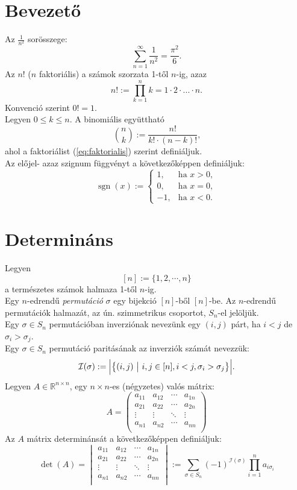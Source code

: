 \documentclass{article}
\DeclareMathOperator{\sign}{sgn}
\begin{document}
\section{Bevezető}
Az $\frac{1}{n^2}$ sorösszege:
\[ \sum_{n=1}^\infty \frac{1}{n^2} = \frac{\pi^2}{6} \text{.} \]
Az $n!$ ($n$ faktoriális) a számok szorzata 1-től $n$-ig, azaz
\begin{equation}\label{eq:faktorialis}
n! := \prod_{k = 1}^n k = 1 \cdot 2 \cdot ... \cdot n \text{.}
\end{equation}
Konvenció szerint $0! = 1$.\\
Legyen $0 \leq k \leq n$. A binomiális együttható
\[ \binom{n}{k} := \frac{n!}{k! \cdot (n - k)!} \text{,} \]
ahol a faktoriálist (\ref{eq:faktorialis}) szerint definiáljuk.\\
Az előjel- azaz szignum függvényt a következőképpen definiáljuk:
\[ \sign(x) :=
\begin{cases}
1, & \text{ha } x > 0, \\
0, & \text{ha } x = 0, \\
-1, & \text{ha } x < 0.
\end{cases} \]
\clearpage
\section{Determináns}
Legyen
\[ [n] := \{1, 2, \cdots, n\} \]
a természetes számok halmaza 1-től $n$-ig.\\
Egy $n$-edrendű \textit{permutáció} $\sigma$ egy bijekció $[n]$-ből $[n]$-be. Az $n$-edrendű permutációk halmazát, az ún. szimmetrikus csoportot, $S_n$-el jelöljük.\\
Egy $\sigma \in S_n$ permutációban inverziónak nevezünk egy $(i, j)$ párt, ha $i < j$ de $\sigma_i > \sigma_j$.\\
Egy $\sigma \in S_n$ permutáció paritásának az inverziók számát nevezzük:
\[ \mathcal{I} (\sigma) := \Bigl| \bigl\{ (i, j) \text{ } \big| \text{ } i, j \in [n], i < j, \sigma_i > \sigma_j \bigr\} \Bigr| \text{.} \]
Legyen $A \in \mathbb{R}^{n \times n}$, egy ${n \times n}$-es (négyzetes) valós mátrix:
\[ A = \left( \begin{matrix}
a_{11} & a_{12} & \cdots & a_{1n} \\
a_{21} & a_{22} & \cdots & a_{2n} \\
\vdots & \vdots & \ddots & \vdots \\
a_{n1} & a_{n2} & \cdots & a_{nn} \\
\end{matrix} \right) \]
Az $A$ mátrix determinánsát a következőképpen definiáljuk:
\begin{equation}
\det(A) = \begin{vmatrix}
a_{11} & a_{12} & \cdots & a_{1n} \\
a_{21} & a_{22} & \cdots & a_{2n} \\
\vdots & \vdots & \ddots & \vdots \\
a_{n1} & a_{n2} & \cdots & a_{nn} \\
\end{vmatrix} := \sum_{\sigma \in S_n} (-1)^{\mathcal{I}(\sigma)} \prod_{i = 1}^n a_{i\sigma_i}
\end{equation}
\clearpage
\end{document}

